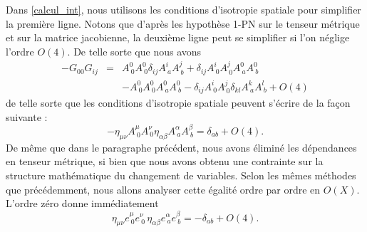 			Dans \ref{calcul_int}, nous utilisons les conditions d'isotropie spatiale pour simplifier la première ligne. Notons que d'après les hypothèse 1-PN sur le tenseur métrique et sur la matrice jacobienne, la deuxième ligne peut se simplifier si l'on néglige l'ordre $O(4)$. De telle sorte que nous avons 
			\begin{eqnarray}
			 	-G_{00}G_{ij}&=& A^0_{\ 0}A^0_{\ 0}\delta_{ij}A^i_{\ a}A^j_{\ b} + \delta_{ij}A^i_{\ 0}A^j_{\ 0}A^0_{\ a}A^0_{\ b} \nonumber\\
			 				  && -A^0_{\ 0}A^0_{\ 0}A^0_{\ a}A^0_{\ b} - \delta_{ij}A^i_{\ 0}A^j_{\ 0}\delta_{kl}A^k_{\ a}A^l_{\ b} + O(4)
			\end{eqnarray} 
			de telle sorte que les conditions d'isotropie spatiale peuvent s'écrire de la façon suivante :
			\begin{equation}
				-\eta_{\mu\nu}A^\mu_{\ 0}A^\nu_{\ 0}\eta_{\alpha\beta}A^\alpha_{\ a}A^\beta_{\ b}=\delta_{ab}+O(4).\label{contrainte_isotropie}
			\end{equation}
			De même que dans le paragraphe précédent, nous avons éliminé les dépendances en tenseur métrique, si bien que nous avons obtenu une contrainte sur la structure mathématique du changement de variables. Selon les mêmes méthodes que précédemment, nous allons analyser cette égalité ordre par ordre en $O(X)$. L'ordre zéro donne immédiatement
			\begin{equation}
				\eta_{\mu\nu}e^\mu_{\ 0}e^\nu_{\ 0}\, 	\eta_{\alpha\beta}e^\alpha_{\ a}e^\beta_{\ b}=-\delta_{ab}+O(4).
			\end{equation}

